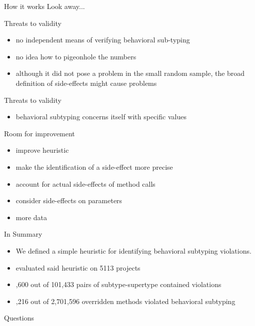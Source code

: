 \documentclass{beamer}
\begin{document}
\begin{frame}{How it works}
\Huge
  Look away...
\end{frame}

\begin{frame}{Threats to validity}
\huge
\begin{itemize} 
  \item no independent means of verifying behavioral sub-typing
  \item \pause no idea how to pigeonhole the numbers 
  \item \pause although it did not pose a problem in the small random sample\pause, the broad definition of side-effects might cause problems
\end{itemize}
\end{frame}

\begin{frame}{Threats to validity}
\huge
\begin{itemize} 
  \item behavioral subtyping concerns itself with specific values
\end{itemize}
\end{frame}

\begin{frame}[fragile]{Room for improvement}
\huge
\begin{itemize}
\item improve heuristic
\item \pause make the identification of a side-effect more precise
\item \pause account for actual side-effects of method calls
\item \pause consider side-effects on parameters
\item \pause more data

\end{itemize}
\end{frame}



\begin{frame}{In Summary}
\Large
\begin{itemize}
\item We defined a simple heuristic for identifying behavioral subtyping violations.
\item \pause evaluated said heuristic on 5113 projects
\item {},600 out of 101,433 pairs of subtype-supertype contained violations
\item {},216 out of 2,701,596 overridden methods violated behavioral subtyping

\end{itemize}
\end{frame}

\begin{frame}{Questions}
  \Huge
\end{frame}
\end{document}
